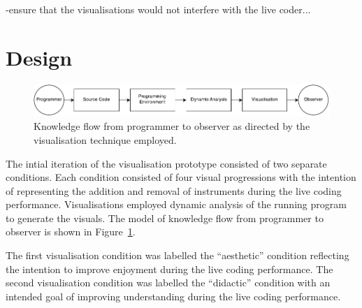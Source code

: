 -ensure that the visualisations would not interfere with the live coder... \more

\section{Design}

\begin{figure}
  \centering \includegraphics[width=\columnwidth]{../images/diagrams/knowledge-flow-initial.pdf}
  \caption{Knowledge flow from programmer to observer as directed by the visualisation technique employed.}
\label{fig:knowledge-flow-initial}
\end{figure}

The intial iteration of the visualisation prototype consisted of two separate conditions. Each condition consisted of four visual progressions with the intention of representing the addition and removal of instruments during the live coding performance. Visualisations employed dynamic analysis of the running program to generate the visuals. The model of knowledge flow from programmer to observer is shown in Figure~\ref{fig:knowledge-flow-initial}.

The first visualisation condition was labelled the ``aesthetic'' condition reflecting the intention to improve enjoyment during the live coding performance. The second visualisation condition was labelled the ``didactic'' condition with an intended goal of improving understanding during the live coding performance.





